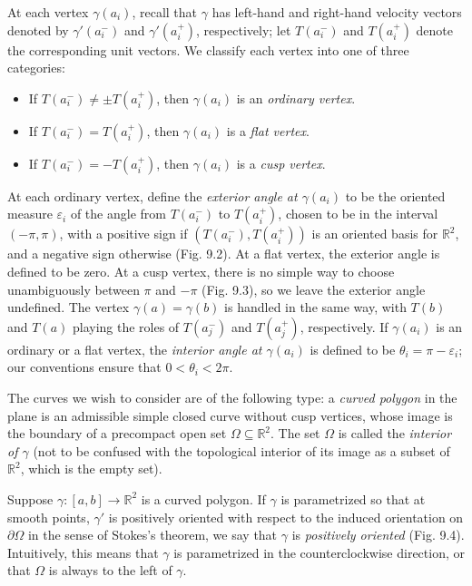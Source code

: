 At each vertex $\gamma(a_i)$, recall that $\gamma$ has left-hand and right-hand velocity vectors denoted by $\gamma'(a_i^-)$ and $\gamma'(a_i^+)$, respectively; let $T(a_i^-)$ and $T(a_i^+)$ denote the corresponding unit vectors. We classify each vertex into one of three categories:
\begin{itemize}
\item If $T(a_i^-) \neq \pm T(a_i^+)$, then $\gamma(a_i)$ is an \emph{ordinary vertex}.
\item If $T(a_i^-) = T(a_i^+)$, then $\gamma(a_i)$ is a \emph{flat vertex}.
\item If $T(a_i^-) = -T(a_i^+)$, then $\gamma(a_i)$ is a \emph{cusp vertex}.
\end{itemize}


At each ordinary vertex, define the \emph{exterior angle at $\gamma(a_i)$} to be the oriented measure $\varepsilon_i$ of the angle from $T(a_i^-)$ to $T(a_i^+)$, chosen to be in the interval $(-\pi, \pi)$, with a positive sign if $(T(a_i^-), T(a_i^+))$ is an oriented basis for $\mathbb{R}^2$, and a negative sign otherwise (Fig. 9.2). At a flat vertex, the exterior angle is defined to be zero. At a cusp vertex, there is no simple way to choose unambiguously between $\pi$ and $-\pi$ (Fig. 9.3), so we leave the exterior angle undefined. The vertex $\gamma(a) = \gamma(b)$ is handled in the same way, with $T(b)$ and $T(a)$ playing the roles of $T(a_j^-)$ and $T(a_j^+)$, respectively. If $\gamma(a_i)$ is an ordinary or a flat vertex, the \emph{interior angle at $\gamma(a_i)$} is defined to be $\theta_i = \pi - \varepsilon_i$; our conventions ensure that $0 < \theta_i < 2\pi$.

The curves we wish to consider are of the following type: a \emph{curved polygon} in the plane is an admissible simple closed curve without cusp vertices, whose image is the boundary of a precompact open set $\Omega \subseteq \mathbb{R}^2$. The set $\Omega$ is called the \emph{interior of $\gamma$} (not to be confused with the topological interior of its image as a subset of $\mathbb{R}^2$, which is the empty set).

Suppose $\gamma : [a,b] \to \mathbb{R}^2$ is a curved polygon. If $\gamma$ is parametrized so that at smooth points, $\gamma'$ is positively oriented with respect to the induced orientation on $\partial \Omega$ in the sense of Stokes's theorem, we say that $\gamma$ is \emph{positively oriented} (Fig. 9.4). Intuitively, this means that $\gamma$ is parametrized in the counterclockwise direction, or that $\Omega$ is always to the left of $\gamma$.

